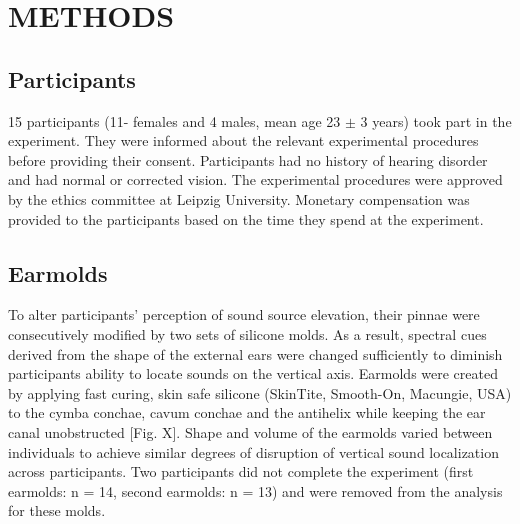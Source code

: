 \section{METHODS}\label{sec2}%
\subsection{Participants}
15 participants (11- females and 4 males, mean age 23 $\pm$ 3 years) took part in the experiment.
They were informed about the relevant experimental procedures before providing their consent. Participants had no history of hearing disorder and had normal or corrected vision. The experimental procedures were approved by the ethics committee at Leipzig University. Monetary compensation was provided to the participants based on the time they spend at the experiment.

\subsection{Earmolds}
To alter participants’ perception of sound source elevation, their pinnae were consecutively modified by two sets of silicone molds. As a result, spectral cues derived from the shape of the external ears were changed sufficiently to diminish participants ability to locate sounds on the vertical axis. Earmolds were created by applying fast curing, skin safe silicone (SkinTite, Smooth-On, Macungie, USA) to the cymba conchae, cavum conchae and the antihelix while keeping the ear canal unobstructed [Fig. X]. Shape and volume of the earmolds varied between individuals to achieve similar degrees of disruption of vertical sound localization across participants. Two participants did not complete the experiment (first earmolds: n = 14, second earmolds: n = 13) and were removed from the analysis for these molds. 

